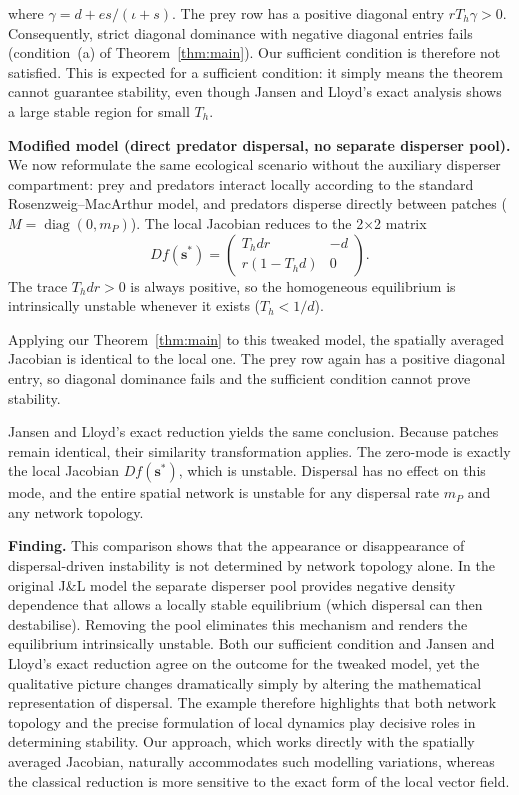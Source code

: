 \documentclass[12pt,a4paper]{article}
\theoremstyle{definition}
\begin{document}
where \(\gamma = d + e s/(\iota+s) \). The prey row has a positive diagonal entry \(r T_h \gamma > 0\). Consequently, strict diagonal dominance with negative diagonal entries fails (condition~(a) of Theorem~\ref{thm:main}). Our sufficient condition is therefore not satisfied. This is expected for a sufficient condition: it simply means the theorem cannot guarantee stability, even though Jansen and Lloyd's exact analysis shows a large stable region for small \(T_h\).



\textbf{Modified model (direct predator dispersal, no separate disperser pool).}
We now reformulate the same ecological scenario without the auxiliary disperser compartment: prey and predators interact locally according to the standard Rosenzweig--MacArthur model, and predators disperse directly between patches (\(M = \operatorname{diag}(0, m_P)\)). The local Jacobian reduces to the 2×2 matrix
\[
Df(\mathbf{s}^*) = \begin{pmatrix}
T_h d r & -d \\
r(1-T_h d) & 0
\end{pmatrix}.
\]
The trace \(T_h d r > 0\) is always positive, so the homogeneous equilibrium is intrinsically unstable whenever it exists (\(T_h < 1/d\)).  



Applying our Theorem~\ref{thm:main} to this tweaked model, the spatially averaged Jacobian is identical to the local one. The prey row again has a positive diagonal entry, so diagonal dominance fails and the sufficient condition cannot prove stability.  

Jansen and Lloyd's exact reduction yields the same conclusion. Because patches remain identical, their similarity transformation applies. The zero-mode is exactly the local Jacobian \(Df(\mathbf{s}^*)\), which is unstable. Dispersal has no effect on this mode, and the entire spatial network is unstable for any dispersal rate \(m_P\) and any network topology.


\textbf{Finding.} This comparison shows that the appearance or disappearance of dispersal-driven instability is not determined by network topology alone. In the original J\&L model the separate disperser pool provides negative density dependence that allows a locally stable equilibrium (which dispersal can then destabilise). Removing the pool eliminates this mechanism and renders the equilibrium intrinsically unstable. Both our sufficient condition and Jansen and Lloyd's exact reduction agree on the outcome for the tweaked model, yet the qualitative picture changes dramatically simply by altering the mathematical representation of dispersal. The example therefore highlights that both network topology and the precise formulation of local dynamics play decisive roles in determining stability. Our approach, which works directly with the spatially averaged Jacobian, naturally accommodates such modelling variations, whereas the classical reduction is more sensitive to the exact form of the local vector field.
\end{document}
